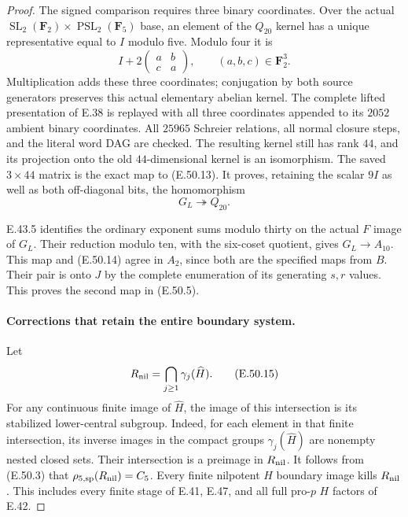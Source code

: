\begin{proof}
The signed comparison requires three binary
coordinates.  Over the actual
$\operatorname{SL}_2(\mathbf F_2)\times
 \operatorname{PSL}_2(\mathbf F_5)$
base, an element of the $Q_{20}$ kernel has a
unique representative equal to $I$ modulo five.
Modulo four it is
\[
              I+2\begin{pmatrix}a&b\\c&a\end{pmatrix},
                    \qquad (a,b,c)\in\mathbf F_2^3.
 \tag{E.50.13}
\]
Multiplication adds these three coordinates;
conjugation by both source generators preserves
this actual elementary abelian kernel.
The complete lifted presentation of E.38 is
replayed with all three coordinates appended
to its $2052$ ambient binary coordinates.
All $25965$ Schreier relations, all normal
closure steps, and the literal word DAG are
checked.  The resulting kernel still has
rank $44$, and its projection onto the old
$44$-dimensional kernel is an isomorphism.
The saved $3\times44$ matrix is the exact
map to \textup{(E.50.13)}.
It proves, retaining the scalar $9I$ as well
as both off-diagonal bits, the homomorphism
\[
                         G_L\twoheadrightarrow Q_{20}.
 \tag{E.50.14}
\]

E.43.5 identifies the ordinary exponent sums
modulo thirty on the actual $F$ image of
$G_L$.  Their reduction modulo ten, with
the six-coset quotient, gives $G_L\to A_{10}$.
This map and \textup{(E.50.14)} agree in
$A_2$, since both are the specified maps
from $B$.  Their pair is onto $J$ by the
complete enumeration of its generating
$s,r$ values.  This proves the second map
in \textup{(E.50.5)}.

\paragraph{Corrections that retain the entire boundary system.}
Let
\[
             R_{\rm nil}=\bigcap_{j\ge1}\gamma_j(\widehat H).
 \tag{E.50.15}
\]
For any continuous finite image of $\widehat H$,
the image of this intersection is its stabilized
lower-central subgroup.  Indeed, for each element
in that finite intersection, its inverse images
in the compact groups $\gamma_j(\widehat H)$ are
nonempty nested closed sets.  Their intersection
is a preimage in $R_{\rm nil}$.
It follows from \textup{(E.50.3)} that
$\rho_{5,\mathrm{sp}}(R_{\rm nil})=C_5$.
Every finite nilpotent $H$ boundary image kills
$R_{\rm nil}$.  This includes every finite stage
of E.41, E.47, and all full pro-$p$ $H$ factors
of E.42.


\end{proof}
